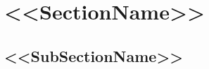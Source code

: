 \documentclass[11pt,a4paper]{article}
\begin{document}
\tableofcontents

\section{<<SectionName>>}

\subsection{<<SubSectionName>>}

\pagebreak


\end{document}
